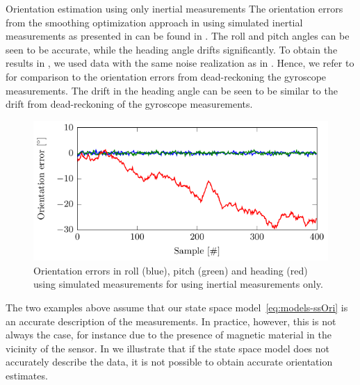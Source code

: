 \begin{myexample}{Orientation estimation using only inertial measurements}%
\label{ex:oriEst-noMagData}%
The orientation errors from the smoothing optimization approach in  using simulated inertial measurements as presented in  can be found in . The roll and pitch angles can be seen to be accurate, while the heading angle drifts significantly. To obtain the results in , we used data with the same noise realization as in . Hence, we refer to  for comparison to the orientation errors from dead-reckoning the gyroscope measurements. The drift in the heading angle can be seen to be similar to the drift from dead-reckoning of the gyroscope measurements. 

\begin{figure}[t]
	\centering
	\includegraphics[scale = 1]{figure4_6.pdf}
    	\caption{Orientation errors in roll (blue), pitch (green) and heading (red) using simulated measurements for  using inertial measurements only.}
	\label{fig:oriEst-noMagData}
\end{figure}
\end{myexample}

The two examples above assume that our state space model~\eqref{eq:models-ssOri} is an accurate description of the measurements. In practice, however, this is not always the case, for instance due to the presence of magnetic material in the vicinity of the sensor. In  we illustrate that if the state space model does not accurately describe the data, it is not possible to obtain accurate orientation estimates. 

